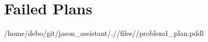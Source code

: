 \documentclass[a4paper,12pt]{article}
\begin{document}
\section{Failed Plans}
\begin{minipage}[t]{13cm} /\-home/\-debo/\-git/\-jason\_assistant/\-./\-/\-files/\-/\-problem1\_plan.pddl \end{minipage}
\end{document}
